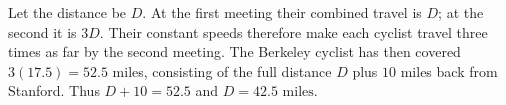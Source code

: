 Let the distance be $D$. At the first meeting their combined travel is $D$; at the second it is $3D$. Their constant speeds therefore make each cyclist travel three times as far by the second meeting. The Berkeley cyclist has then covered $3(17.5)=52.5$ miles, consisting of the full distance $D$ plus $10$ miles back from Stanford. Thus $D+10=52.5$ and $\boxed{D=42.5\text{ miles}}$.
